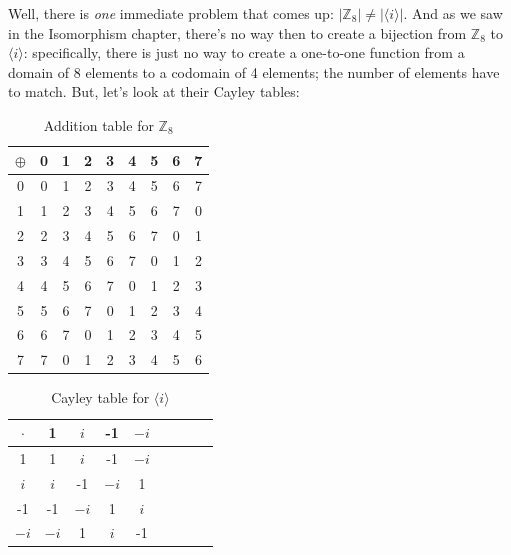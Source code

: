 Well, there is \emph{one} immediate problem that comes up:  $|{\mathbb Z_8}| \neq |\langle i \rangle|$.  And as we saw in the Isomorphism chapter, there's no way then to create a bijection from ${\mathbb Z_8}$ to $\langle i \rangle$:  specifically, there is just no way to create a one-to-one function from a domain of 8 elements to a codomain of 4 elements; the number of elements have to match.  But, let's look at their Cayley tables:

\begin{table}[H]
\caption{\label{groups_Z8_add_table2}Addition table for ${\mathbb Z}_8$}{\small
\begin{center}
\begin{tabular}{c|cccccccc}
$\oplus$ & 0 & 1 & 2 & 3 & 4 & 5 & 6 & 7 \\
\hline
0        & 0 & 1 & 2 & 3 & 4 & 5 & 6 & 7 \\
1       & 1 & 2 & 3 & 4 & 5 & 6 & 7 & 0 \\
2       & 2 & 3 & 4 & 5 & 6 & 7 & 0 & 1\\
3       & 3 & 4 & 5 & 6 & 7 & 0 & 1 & 2\\
4       & 4 & 5 & 6 & 7 & 0 & 1 & 2 & 3\\
5       & 5 & 6 & 7 & 0 & 1 & 2 & 3 & 4\\
6       & 6 & 7 & 0 & 1 & 2 & 3 & 4 & 5\\
7       & 7 & 0 & 1 & 2 & 3 & 4 & 5 & 6\\
\end{tabular}
\end{center}
}
\end{table}

\begin{table}[H]
\caption{Cayley table for $\langle i \rangle$}
\label{4_roots_table2}
{\small
\begin{center}
\begin{tabular}{c|cccccccc}
$\cdot$ & 1 &$i$ & -1 & $-i$  \\
\hline
1        & 1 &$i$ & -1 &$-i$  \\
$i$       &$i$ & -1 & $-i$ & 1  \\
-1       & -1 & $-i$ & 1 & $i$ \\
$-i$       & $-i$ & 1 & $i$ & -1 \\

\end{tabular}
\end{center}
}
\end{table}  

